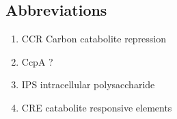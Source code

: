 \documentclass{article}
\begin{document}
\subsection{Abbreviations}

\begin{enumerate}
\item CCR Carbon catabolite repression
\item CcpA ?
\item IPS intracellular polysaccharide
\item CRE catabolite responsive elements
\end{enumerate}

\renewcommand*{\refname}{Literature Cited}


\end{document}

